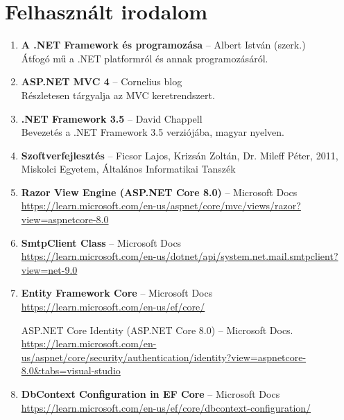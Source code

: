 \section*{Felhasznált irodalom}

\begin{enumerate}
    \item \label{ref:albert_dotnet} \textbf{A .NET Framework és programozása} – Albert István (szerk.)\\
    Átfogó mű a .NET platformról és annak programozásáról.

    \item \label{ref:cornelius_mvc} \textbf{ASP.NET MVC 4} – Cornelius blog\\
    Részletesen tárgyalja az MVC keretrendszert. 

    \item \label{ref:chappell_dotnet} \textbf{.NET Framework 3.5} – David Chappell\\
    Bevezetés a .NET Framework 3.5 verziójába, magyar nyelven.

    \item \label{ref:ficsor_szoftver} \textbf{Szoftverfejlesztés} – Ficsor Lajos, Krizsán Zoltán, Dr. Mileff Péter, 2011, Miskolci Egyetem, Általános Informatikai Tanszék

    \item \label{ref:razor_docs} \textbf{Razor View Engine (ASP.NET Core 8.0)} – Microsoft Docs\\
    \url{https://learn.microsoft.com/en-us/aspnet/core/mvc/views/razor?view=aspnetcore-8.0}

    \item \label{ref:smtp_client} \textbf{SmtpClient Class} – Microsoft Docs\\
    \url{https://learn.microsoft.com/en-us/dotnet/api/system.net.mail.smtpclient?view=net-9.0}

    \item \label{ref:ef_core} \textbf{Entity Framework Core} – Microsoft Docs\\
    \url{https://learn.microsoft.com/en-us/ef/core/}

    ASP.NET Core Identity (ASP.NET Core 8.0) – Microsoft Docs.\\
    \url{https://learn.microsoft.com/en-us/aspnet/core/security/authentication/identity?view=aspnetcore-8.0&tabs=visual-studio}


    \item \label{ref:ef_dbcontext} \textbf{DbContext Configuration in EF Core} – Microsoft Docs\\
    \url{https://learn.microsoft.com/en-us/ef/core/dbcontext-configuration/}


\end{enumerate}
